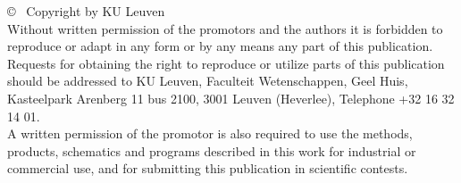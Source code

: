 \null
\vfill
\copyright~ Copyright by KU Leuven \\

Without written permission of the promotors and the authors it is forbidden to reproduce or adapt in any form or by any means any part of this publication. Requests for obtaining the right to reproduce or utilize parts of this publication should be addressed to KU Leuven, Faculteit Wetenschappen, Geel Huis, Kasteelpark Arenberg 11 bus 2100, 3001 Leuven (Heverlee), Telephone +32 16 32 14 01. \\

A written permission of the promotor is also required to use the methods, products, schematics and programs described in this work for industrial or commercial use, and for submitting this publication in scientific contests.
\cleardoublepage